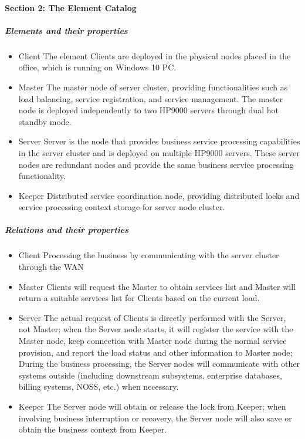 \documentclass{article}
\begin{document}
			\paragraph{Section 2: The Element Catalog}
			\subparagraph{Elements and their properties}
			\begin{itemize}
			\item{Client} The element Clients are deployed in the physical nodes placed in the office, which is running on Windows 10 PC.
			\item{Master} The master node of server cluster, providing functionalities such as load balancing, service registration, and service management. The master node is deployed independently to two HP9000 servers through dual hot standby mode.
			\item{Server} Server is the node that provides business service processing capabilities in the server cluster and is deployed on multiple HP9000 servers. These server nodes are redundant nodes and provide the same business service processing functionality.
			\item{Keeper} Distributed service coordination node, providing distributed locks and service processing context storage for server node cluster.
			\end{itemize}
			\subparagraph{Relations and their properties}
			\begin{itemize}
			\item{Client} Processing the business by communicating
			 with the server cluster through the WAN
			\item{Master} Clients will request the Master to obtain services list and Master will return a suitable services list for Clients based on the current load.
			\item{Server} The actual request of Clients is directly performed with the Server, not Master; when the Server node starts, it will register the service with the Master node, keep connection with Master node during the normal service provision, and report the load status and other information to Master node; During the business processing, the Server nodes will communicate with other systems outside (including downstream subsystems, enterprise databases, billing systems, NOSS, etc.) when necessary.
			\item{Keeper} The Server node will obtain or release the lock from Keeper; when involving business interruption or recovery, the Server node will also save or obtain the business context from Keeper.
			\end{itemize}
\end{document}
